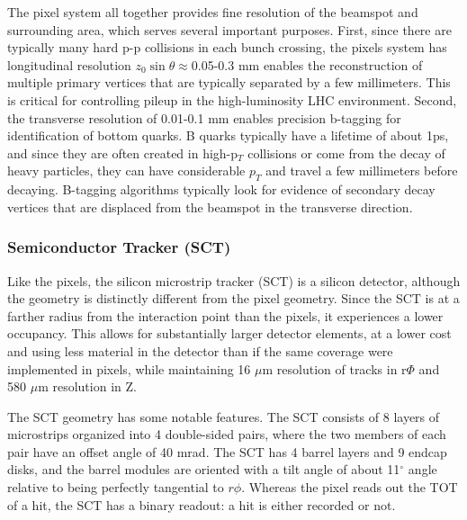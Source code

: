The pixel system all together provides fine resolution of the beamspot and surrounding area, which serves several important purposes.  First, since there are typically many hard p-p collisions in each bunch crossing, the pixels system has longitudinal resolution $z_0\sin\theta\approx$0.05-0.3 mm enables the reconstruction of multiple primary vertices that are typically separated by a few millimeters.  This is critical for controlling pileup in the high-luminosity LHC environment.  Second, the transverse resolution of 0.01-0.1 mm enables precision b-tagging for identification of bottom quarks.  B quarks typically have a lifetime of about 1ps, and since they are often created in high-p$_T$ collisions or come from the decay of heavy particles, they can have considerable $p_T$ and travel a few millimeters before decaying.  B-tagging algorithms typically look for evidence of secondary decay vertices that are displaced from the beamspot in the transverse direction.   


\subsubsection{Semiconductor Tracker (SCT)}
\label{sec:sct}
Like the pixels, the silicon microstrip tracker (SCT) is a silicon detector, although the geometry is distinctly different from the pixel geometry.  Since the SCT is at a farther radius from the interaction point than the pixels, it experiences a lower occupancy.  This allows for substantially larger detector elements, at a lower cost and using less material in the detector than if the same coverage were implemented in pixels, while maintaining 16 $\mu$m resolution of tracks in r$\Phi$ and 580 $\mu$m resolution in Z.   

The SCT geometry has some notable features.  The SCT consists of 8 layers of microstrips organized into 4 double-sided pairs, where the two members of each pair have an offset angle of 40 mrad.  The SCT has 4 barrel layers and 9 endcap disks, and the barrel modules are oriented with a tilt angle of about 11$^\circ$ angle relative to being perfectly tangential to $r\phi$.  Whereas the pixel reads out the TOT of a hit, the SCT has a binary readout: a hit is either recorded or not.



